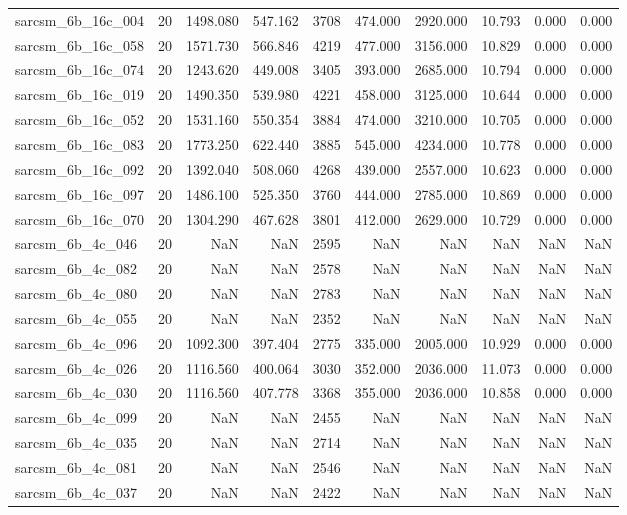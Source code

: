 \begin{tabular}{lrrrrrrrrr}
sarcsm\_6b\_16c\_004 & 20 & 1498.080 & 547.162 & 3708 & 474.000 & 2920.000 & 10.793 & 0.000 & 0.000 \\
sarcsm\_6b\_16c\_058 & 20 & 1571.730 & 566.846 & 4219 & 477.000 & 3156.000 & 10.829 & 0.000 & 0.000 \\
sarcsm\_6b\_16c\_074 & 20 & 1243.620 & 449.008 & 3405 & 393.000 & 2685.000 & 10.794 & 0.000 & 0.000 \\
sarcsm\_6b\_16c\_019 & 20 & 1490.350 & 539.980 & 4221 & 458.000 & 3125.000 & 10.644 & 0.000 & 0.000 \\
sarcsm\_6b\_16c\_052 & 20 & 1531.160 & 550.354 & 3884 & 474.000 & 3210.000 & 10.705 & 0.000 & 0.000 \\
sarcsm\_6b\_16c\_083 & 20 & 1773.250 & 622.440 & 3885 & 545.000 & 4234.000 & 10.778 & 0.000 & 0.000 \\
sarcsm\_6b\_16c\_092 & 20 & 1392.040 & 508.060 & 4268 & 439.000 & 2557.000 & 10.623 & 0.000 & 0.000 \\
sarcsm\_6b\_16c\_097 & 20 & 1486.100 & 525.350 & 3760 & 444.000 & 2785.000 & 10.869 & 0.000 & 0.000 \\
sarcsm\_6b\_16c\_070 & 20 & 1304.290 & 467.628 & 3801 & 412.000 & 2629.000 & 10.729 & 0.000 & 0.000 \\
sarcsm\_6b\_4c\_046 & 20 & NaN & NaN & 2595 & NaN & NaN & NaN & NaN & NaN \\
sarcsm\_6b\_4c\_082 & 20 & NaN & NaN & 2578 & NaN & NaN & NaN & NaN & NaN \\
sarcsm\_6b\_4c\_080 & 20 & NaN & NaN & 2783 & NaN & NaN & NaN & NaN & NaN \\
sarcsm\_6b\_4c\_055 & 20 & NaN & NaN & 2352 & NaN & NaN & NaN & NaN & NaN \\
sarcsm\_6b\_4c\_096 & 20 & 1092.300 & 397.404 & 2775 & 335.000 & 2005.000 & 10.929 & 0.000 & 0.000 \\
sarcsm\_6b\_4c\_026 & 20 & 1116.560 & 400.064 & 3030 & 352.000 & 2036.000 & 11.073 & 0.000 & 0.000 \\
sarcsm\_6b\_4c\_030 & 20 & 1116.560 & 407.778 & 3368 & 355.000 & 2036.000 & 10.858 & 0.000 & 0.000 \\
sarcsm\_6b\_4c\_099 & 20 & NaN & NaN & 2455 & NaN & NaN & NaN & NaN & NaN \\
sarcsm\_6b\_4c\_035 & 20 & NaN & NaN & 2714 & NaN & NaN & NaN & NaN & NaN \\
sarcsm\_6b\_4c\_081 & 20 & NaN & NaN & 2546 & NaN & NaN & NaN & NaN & NaN \\
sarcsm\_6b\_4c\_037 & 20 & NaN & NaN & 2422 & NaN & NaN & NaN & NaN & NaN \\

\end{tabular}
